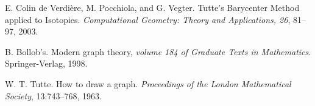 \begin{thebibliography}{}

 E. Colin de Verdière, M. Pocchiola, and G. Vegter. Tutte's Barycenter Method applied to Isotopies. \emph{Computational Geometry: Theory and Applications, 26}, 81–97, 2003.

 B. Bollob's. Modern graph theory, \emph{volume 184 of Graduate Texts in Mathematics}. Springer-Verlag, 1998.

 W. T. Tutte. How to draw a graph. \emph{Proceedings of the London Mathematical Society}, 13:743–768, 1963.





   
\end{thebibliography}
